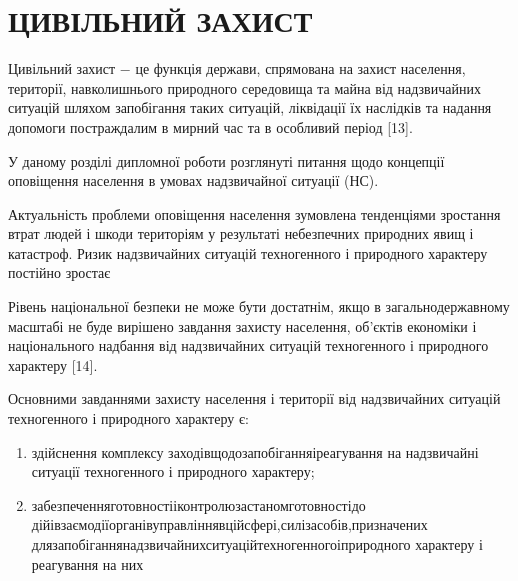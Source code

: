\section{ЦИВІЛЬНИЙ ЗАХИСТ}

Цивільний захист $-$ це функція держави, спрямована на захист населення, території, навколишнього природного середовища та майна від надзвичайних ситуацій шляхом запобігання таких ситуацій, ліквідації їх наслідків та надання допомоги постраждалим в мирний час та в особливий період [13].

У даному розділі дипломної роботи розглянуті питання щодо концепції оповіщення населення в умовах надзвичайної ситуації (НС).

Актуальність проблеми оповіщення населення зумовлена тенденціями зростання втрат людей і шкоди територіям у результаті небезпечних природних явищ і катастроф. Ризик надзвичайних ситуацій техногенного і природного характеру постійно зростає

Рівень національної безпеки не може бути достатнім, якщо в загальнодержавному масштабі не буде вирішено завдання захисту населення, об'єктів економіки і національного надбання від надзвичайних ситуацій техногенного і природного характеру [14].

Основними завданнями захисту населення і території від надзвичайних ситуацій техногенного і природного характеру є:

\begin{enumerate}
	\item здійснення \hfill комплексу \hfill заходів\hfill щодо\hfill запобігання\hfill і\hfill реагування \newline \hspace*{-20mm} на надзвичайні ситуації техногенного і природного характеру;
	\item забезпечення\hfill готовності\hfill і\hfill контролю\hfill за\hfill станом\hfill готовності\hfill до\newline \hspace*{-20mm} дій\hfill і\hfill взаємодії\hfill органів\hfill управління\hfill в\hfill цій\hfill сфері,\hfill сил\hfill і\hfill засобів,\hfill призначених\newline \hspace*{-20mm} для\hfill запобігання\hfill надзвичайних\hfill ситуацій\hfill техногенного\hfill і\hfill природного\newline \hspace*{-20mm} характеру і реагування на них
\end{enumerate}

